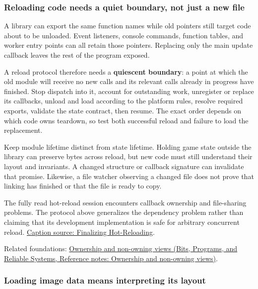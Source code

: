 \subsubsection{Reloading code needs a quiet boundary, not just a new file}\label{06-engine-ii-ch027-reloading-code-needs-a-quiet-boundary-not-just-a-new-file}

\hypertarget{06-engine-ii-ch027-reloading-code-needs-a-quiet-boundary-not-just-a-new-file}{}

A library can export the same function names while old pointers still target code about to be unloaded. Event listeners, console commands, function tables, and worker entry points can all retain those pointers. Replacing only the main update callback leaves the rest of the program exposed.

A reload protocol therefore needs a \textbf{quiescent boundary}: a point at which the old module will receive no new calls and its relevant calls already in progress have finished. Stop dispatch into it, account for outstanding work, unregister or replace its callbacks, unload and load according to the platform rules, resolve required exports, validate the state contract, then resume. The exact order depends on which code owns teardown, so test both successful reload and failure to load the replacement.

Keep module lifetime distinct from state lifetime. Holding game state outside the library can preserve bytes across reload, but new code must still understand their layout and invariants. A changed structure or callback signature can invalidate that promise. Likewise, a file watcher observing a changed file does not prove that linking has finished or that the file is ready to copy.

The fully read hot-reload session encounters callback ownership and file-sharing problems. The protocol above generalizes the dependency problem rather than claiming that its development implementation is safe for arbitrary concurrent reload. \href{https://www.youtube.com/watch?v=U1C9mMrpyF4}{Caption source: Finalizing Hot-Reloading}.

Related foundations: \href{../01-Bits-Programs-and-Reliable-Systems/main.pdf\#nameddest=appendix-d52e4486f527}{Ownership and non-owning views (Bits, Programs, and Reliable Systems, Reference notes: Ownership and non-owning views)}.

\subsubsection{Loading image data means interpreting its layout}\label{06-engine-ii-ch027-loading-image-data-means-interpreting-its-layout}

